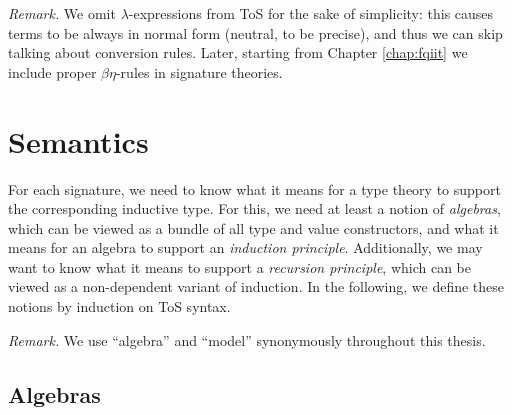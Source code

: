 \documentclass[12pt,a4paper,twoside,openany]{book}
\theoremstyle{remark}
\theoremstyle{definition}
\begin{document}
\emph{Remark.} We omit $\lambda$-expressions from ToS for the sake of
simplicity: this causes terms to be always in normal form (neutral, to be
precise), and thus we can skip talking about conversion rules. Later, starting
from Chapter \ref{chap:fqiit} we include proper $\beta\eta$-rules in signature
theories.

\section{Semantics}
\label{sec:simple-semantics}

For each signature, we need to know what it means for a type theory to support
the corresponding inductive type. For this, we need at least a notion of
\emph{algebras}, which can be viewed as a bundle of all type and
value constructors, and what it means for an algebra to support an
\emph{induction principle}.  Additionally, we may want to know what it means to
support a \emph{recursion principle}, which can be viewed as a non-dependent
variant of induction. In the following, we define these notions by induction on
ToS syntax.

\emph{Remark.} We use ``algebra'' and ``model'' synonymously throughout
this thesis.

\subsection{Algebras}
\end{document}
